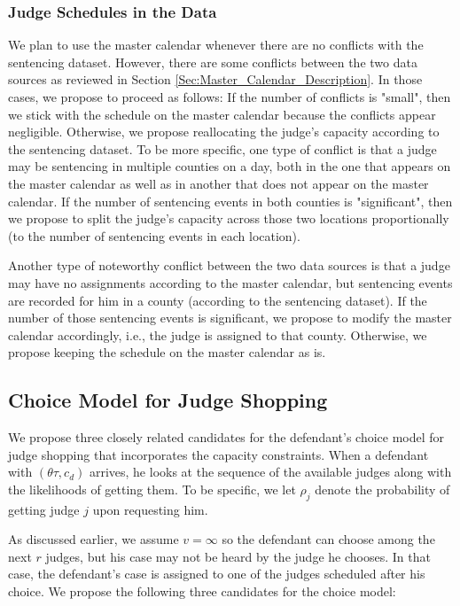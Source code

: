 \documentclass[11pt, oneside]{article}   	%
\theoremstyle{ModifiedStyle}
\begin{document}
\subsubsection{Judge Schedules in the Data}
We plan to use the master calendar whenever there are no conflicts with the sentencing dataset. However, there are some conflicts between the two data sources as reviewed in Section \ref{Sec:Master_Calendar_Description}. In those cases, we propose to proceed as follows: If the number of conflicts is "small", then we stick with the schedule on the master calendar because the conflicts appear negligible. Otherwise, we propose reallocating the judge's capacity according to the sentencing dataset. To be more specific, one type of conflict is that a judge may be sentencing in multiple counties on a day, both in the one that appears on the master calendar as well as in another that does not appear on the master calendar. If the number of sentencing events in both counties is "significant", then we propose to split the judge's capacity across those two locations proportionally (to the number of sentencing events in each location).

Another type of noteworthy conflict between the two data sources is that a judge may have no assignments according to the master calendar, but sentencing events are recorded for him in a county (according to the sentencing dataset). If the number of those sentencing events is significant, we propose to modify the master calendar accordingly, i.e., the judge is assigned to that county. Otherwise, we propose keeping the schedule on the master calendar as is.


\subsection{Choice Model for Judge Shopping}
We propose three closely related candidates for the defendant's choice model for judge shopping that incorporates the capacity constraints. When a defendant with $(\theta\tau,c_d)$ arrives, he looks at the sequence of the available judges along with the likelihoods of getting them. To be specific, we let $\rho_j$ denote the probability of getting judge $j$ upon requesting him.

As discussed earlier, we assume $v=\infty$ so the defendant can choose among the next $r$ judges, but his case may not be heard by the judge he chooses. In that case, the defendant's case is assigned to one of the judges scheduled after his choice. We propose the following three candidates for the choice model:
%
\vspace{-3mm}
\end{document}
